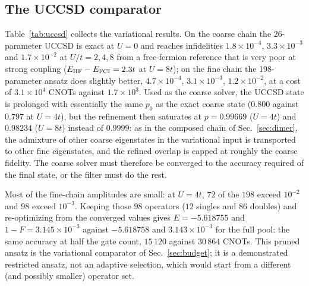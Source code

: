 \documentclass[
  aps,
  prc,
  reprint,
  superscriptaddress,
  floatfix,
  nofootinbib
]{revtex4-2}
\begin{document}
\subsection{The UCCSD comparator}
\label{sec:res-uccsd}
Table~\ref{tab:uccsd} collects the variational results.  On the coarse chain
the 26-parameter UCCSD is exact at $U=0$ and reaches infidelities
$1.8\times10^{-4}$, $3.3\times10^{-3}$ and $1.7\times10^{-2}$ at
$U/t=2,4,8$ from a free-fermion reference that is very poor at strong
coupling ($E_{\rm HF}-E_{\rm FCI}=2.3t$ at $U=8t$); on the fine chain the
198-parameter ansatz does slightly better, $4.7\times10^{-4}$,
$3.1\times10^{-3}$, $1.2\times10^{-2}$, at a cost of $3.1\times10^4$ CNOTs
against $1.7\times10^3$.  Used as the coarse solver, the UCCSD state is
prolonged with essentially the same $p_0$ as the exact coarse state
($0.800$ against $0.797$ at $U=4t$), but the refinement then saturates at
$p=0.99669$ ($U=4t$) and $0.98234$ ($U=8t$) instead of $0.9999$: as in the
composed chain of Sec.~\ref{sec:dimer}, the admixture of other coarse
eigenstates in the variational input is transported to other fine
eigenstates, and the refined overlap is capped at roughly the coarse
fidelity.  The coarse solver must therefore be converged to the accuracy
required of the final state, or the filter must do the rest.

Most of the fine-chain amplitudes are small: at $U=4t$, $72$ of the $198$
exceed $10^{-2}$ and $98$ exceed $10^{-3}$.  Keeping those $98$ operators
($12$ singles and $86$ doubles) and re-optimizing from the converged values
gives $E=-5.618755$ and $1-F=3.145\times10^{-3}$ against $-5.618758$ and
$3.143\times10^{-3}$ for the full pool: the same accuracy at half the gate
count, $15\,120$ against $30\,864$ CNOTs.  This pruned ansatz is the
variational comparator of Sec.~\ref{sec:budget}; it is a demonstrated
restricted ansatz, not an adaptive selection, which would start from a
different (and possibly smaller) operator set.
\end{document}
